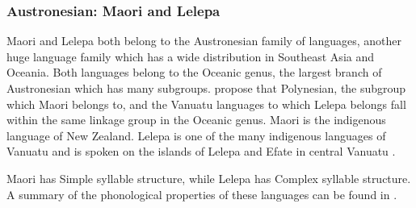 \subsubsection{{Austronesian:} {Maori} {and} {Lelepa}}\label{sec:8.4.3.6}

  Maori and Lelepa both belong to the Austronesian family of languages, another huge language family which has a wide distribution in Southeast Asia and Oceania. Both languages belong to the Oceanic genus, the largest branch of Austronesian which has many subgroups. \citet{LynchEtAl2002} propose that Polynesian, the subgroup which Maori belongs to, and the Vanuatu languages to which Lelepa belongs fall within the same linkage group in the Oceanic genus. Maori is the indigenous language of New Zealand. Lelepa is one of the many indigenous languages of Vanuatu and is spoken on the islands of Lelepa and Efate in central Vanuatu \citep{Lacrampe2014}.

  Maori has Simple syllable structure, while Lelepa has Complex syllable structure. A summary of the phonological properties of these languages can be found in .

